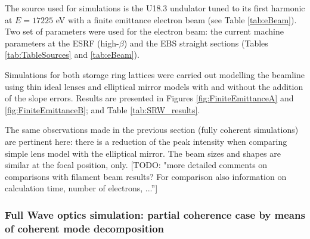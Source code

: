 \documentclass{iucr}              %
\newcommand{\todo}[1]{{\color{red}[TODO: "#1'']}}
\begin{document}
The source used for simulations is the U18.3 undulator tuned to its first harmonic at $E=17225$ eV with a finite emittance electron beam (see Table \ref{tab:eBeam}). Two set of parameters were used for the electron beam: the current machine parameters at the ESRF (high-$\beta$) and the EBS straight sections (Tables \ref{tab:TableSources} and \ref{tab:eBeam}). 

Simulations for both storage ring lattices were carried out modelling the beamline using thin ideal lenses and elliptical mirror models with and without the addition of the slope errors. Results are presented in Figures \ref{fig:FiniteEmittanceA} and \ref{fig:FiniteEmittanceB}; and Table \ref{tab:SRW_results}.

The same observations made in the previous section (fully coherent simulations) are pertinent here: there is a reduction of the peak intensity when comparing simple lens model with the elliptical mirror. The beam sizes and shapes are similar at the focal position, only.
{\todo{more detailed comments on comparisons with filament beam results? For comparison also information on calculation time, number of electrons, ...}}

% 


% 
% 
%  
\subsubsection{Full Wave optics simulation: partial coherence case by means of coherent mode decomposition}
\label{comsyl}
% 
\end{document}
